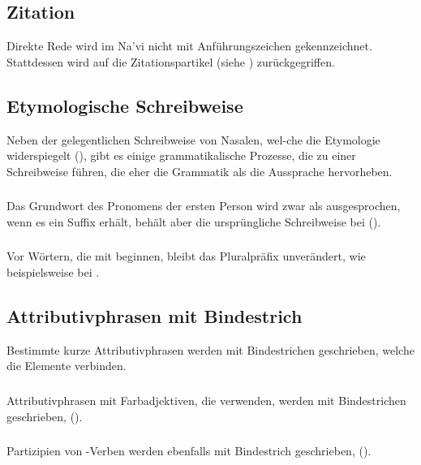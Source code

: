\subsection{Zitation} Direkte Rede wird im Na'vi nicht mit Anführungszeichen gekennzeichnet. Stattdessen wird auf die Zitationspartikel  (siehe ) zurückgegriffen.

\subsection{Etymologische Schreibweise} Neben der gelegentlichen Schreibweise von Nasalen, wel-che die Etymologie widerspiegelt (), gibt es einige grammatikalische Prozesse, die zu einer Schreibweise führen, die eher die Grammatik als die Aussprache hervorheben.

\subsubsection{} Das Grundwort des Pronomens der ersten Person  wird zwar als  ausgesprochen, wenn es ein Suffix erhält, behält aber die ursprüngliche Schreibweise bei
().

\subsubsection{} Vor Wörtern, die mit  beginnen, bleibt das Pluralpräfix  unverändert, wie beispielsweise bei .

\subsection{Attributivphrasen mit Bindestrich} Bestimmte kurze Attributivphrasen werden mit Bindestrichen geschrieben, welche die Elemente verbinden.

\subsubsection{} Attributivphrasen mit Farbadjektiven, die   verwenden, werden mit Bindestrichen geschrieben,   ().

\subsubsection{} Partizipien von -Verben werden ebenfalls mit Bindestrich geschrieben,  
().